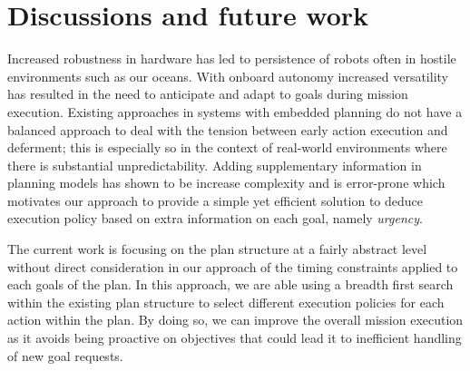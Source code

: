 \section{Discussions and future work}
\label{sec:conclude}

Increased robustness in hardware has led to persistence of robots
often in hostile environments such as our oceans. With onboard
autonomy increased versatility has resulted in the need to anticipate
and adapt to goals during mission execution. Existing approaches in
systems with embedded planning do not have a balanced approach to deal
with the tension between early action execution and deferment; this is
especially so in the context of real-world environments where there is
substantial unpredictability. Adding supplementary information in
planning models has shown to be increase complexity and is error-prone
 which motivates our approach to provide a
simple yet efficient solution to deduce execution policy based on
extra information on each goal, namely {\em urgency}.



The current work is focusing on the plan structure at a fairly
abstract level without direct consideration in our approach of the
timing constraints applied to each goals of the plan. In this approach,
we are able using a breadth first search within the existing plan
structure to select different execution policies for each action
within the plan. By doing so, we can improve the overall mission 
execution as it avoids being proactive on objectives that could lead it
to inefficient handling of new goal requests.


